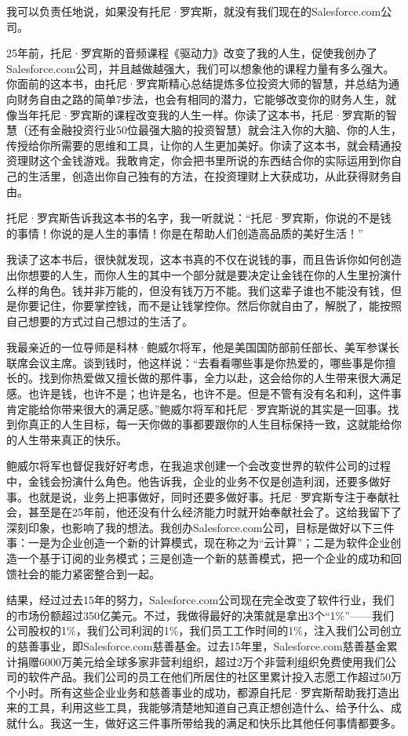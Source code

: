 我可以负责任地说，如果没有托尼·罗宾斯，就没有我们现在的Salesforce.com公司。

25年前，托尼·罗宾斯的音频课程《驱动力》改变了我的人生，促使我创办了Salesforce.com公司，并且越做越强大，我们可以想象他的课程力量有多么强大。你面前的这本书，由托尼·罗宾斯精心总结提炼多位投资大师的智慧，并总结为通向财务自由之路的简单7步法，也会有相同的潜力，它能够改变你的财务人生，就像当年托尼·罗宾斯的课程改变我的人生一样。你读了这本书，托尼·罗宾斯的智慧（还有金融投资行业50位最强大脑的投资智慧）就会注入你的大脑、你的人生，传授给你所需要的思维和工具，让你的人生更加美好。你读了这本书，就会精通投资理财这个金钱游戏。我敢肯定，你会把书里所说的东西结合你的实际运用到你自己的生活里，创造出你自己独有的方法，在投资理财上大获成功，从此获得财务自由。

托尼·罗宾斯告诉我这本书的名字，我一听就说：“托尼·罗宾斯，你说的不是钱的事情！你说的是人生的事情！你是在帮助人们创造高品质的美好生活！”

我读了这本书后，很快就发现，这本书真的不仅在说钱的事，而且告诉你如何创造出你想要的人生，而你人生的其中一个部分就是要决定让金钱在你的人生里扮演什么样的角色。钱并非万能的，但没有钱万万不能。我们这辈子谁也不能没有钱，但是你要记住，你要掌控钱，而不是让钱掌控你。然后你就自由了，解脱了，能按照自己想要的方式过自己想过的生活了。

我最亲近的一位导师是科林·鲍威尔将军，他是美国国防部前任部长、美军参谋长联席会议主席。谈到钱时，他这样说：“去看看哪些事是你热爱的，哪些事是你擅长的。找到你热爱做又擅长做的那件事，全力以赴，这会给你的人生带来很大满足感。也许是钱，也许不是；也许是名，也许不是。但是不管有没有名和利，这件事肯定能给你带来很大的满足感。”鲍威尔将军和托尼·罗宾斯说的其实是一回事。找到你真正的人生目标，每一天你做的事都要跟你的人生目标保持一致，这就能给你的人生带来真正的快乐。

鲍威尔将军也督促我好好考虑，在我追求创建一个会改变世界的软件公司的过程中，金钱会扮演什么角色。他告诉我，企业的业务不仅是创造利润，还要多做好事。也就是说，业务上把事做好，同时还要多做好事。托尼·罗宾斯专注于奉献社会，甚至是在25年前，他还没有什么经济能力时就开始奉献社会了。这给我留下了深刻印象，也影响了我的想法。我创办Salesforce.com公司，目标是做好以下三件事：一是为企业创造一个新的计算模式，现在称之为“云计算”；二是为软件企业创造一个基于订阅的业务模式；三是创造一个新的慈善模式，把一个企业的成功和回馈社会的能力紧密整合到一起。

结果，经过过去15年的努力，Salesforce.com公司现在完全改变了软件行业，我们的市场份额超过350亿美元。不过，我做得最好的决策就是拿出3个“1\%”——我们公司股权的1\%，我们公司利润的1\%，我们员工工作时间的1\%，注入我们公司创立的慈善事业，即Salesforce.com慈善基金。过去15年里，Salesforce.com慈善基金累计捐赠6000万美元给全球多家非营利组织，超过2万个非营利组织免费使用我们公司的软件产品。我们公司的员工在他们所居住的社区里累计投入志愿工作超过50万个小时。所有这些企业业务和慈善事业的成功，都源自托尼·罗宾斯帮助我打造出来的工具，利用这些工具，我能够清楚地知道自己真正想创造什么、给予什么、成就什么。我这一生，做好这三件事所带给我的满足和快乐比其他任何事情都要多。

